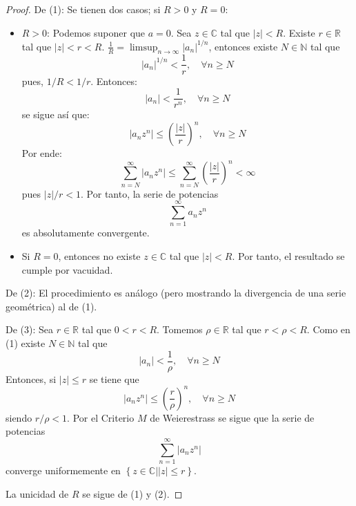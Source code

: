 \documentclass[12pt]{report}
\newcounter{it}
\theoremstyle{largebreak}
\newcommand\abs[1]{\ensuremath{\left|#1\right|}}
\newcommand{\tbf}[1]{\textbf{#1}}
\begin{document}
    \begin{proof}
        De (1): Se tienen dos casos; si $R>0$ y $R=0$:
        \begin{itemize}
            \item \tbf{$R>0$}: Podemos suponer que $a=0$. Sea $z\in\mathbb{C}$ tal que $\abs{z}<R$. Existe $r\in\mathbb{R}$ tal que $\abs{z}<r<R$. $\frac{1}{R}=\limsup_{ n\rightarrow\infty}\abs{a_n}^{ 1/n}$, entonces existe $N\in\mathbb{N}$ tal que
            \begin{equation*}
                \abs{a_n}^{ 1/n}<\frac{1}{r},\quad\forall n\geq N
            \end{equation*}
            pues, $1/R<1/r$. Entonces:
            \begin{equation*}
                \abs{a_n}<\frac{1}{r^n},\quad\forall n\geq N
            \end{equation*}
            se sigue así que:
            \begin{equation*}
                \abs{a_nz^n}\leq\left(\frac{\abs{z}}{r}\right)^n,\quad\forall n\geq N
            \end{equation*}
            Por ende:
            \begin{equation*}
                \sum_{ n=N}^\infty\abs{a_nz^n}\leq\sum_{ n=N}^\infty\left(\frac{\abs{z}}{r}\right)^n<\infty
            \end{equation*}
            pues $\abs{z}/r<1$. Por tanto, la serie de potencias
            \begin{equation*}
                \sum_{ n=1}^\infty a_nz^n
            \end{equation*}
            es absolutamente convergente.
            \item Si $R=0$, entonces no existe $z\in\mathbb{C}$ tal que $\abs{z}<R$. Por tanto, el resultado se cumple por vacuidad.
        \end{itemize}

        De (2): El procedimiento es análogo (pero mostrando la divergencia de una serie geométrica) al de (1).

        De (3): Sea $r\in\mathbb{R}$ tal que $0<r<R$. Tomemos $\rho\in\mathbb{R}$ tal que $r<\rho<R$. Como en (1) existe $N\in\mathbb{N}$ tal que
        \begin{equation*}
            \abs{a_n}<\frac{1}{\rho},\quad\forall n\geq N
        \end{equation*}
        Entonces, si $\abs{z}\leq r$ se tiene que
        \begin{equation*}
            \abs{a_nz^n}\leq\left(\frac{r}{\rho}\right)^n,\quad\forall n\geq N
        \end{equation*}
        siendo $r/\rho<1$. Por el Criterio $M$ de Weierestrass se sigue que la serie de potencias
        \begin{equation*}
            \sum_{ n=1}^\infty \abs{a_nz^n}
        \end{equation*}
        converge uniformemente en $\left\{ z\in\mathbb{C}\Big|\abs{z}\leq r \right\}$.

        La unicidad de $R$ se sigue de (1) y (2).
    \end{proof}
\end{document}

